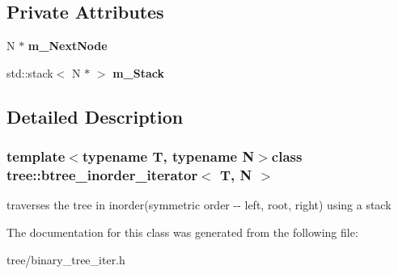 \subsection*{\-Private \-Attributes}
\begin{DoxyCompactItemize}
\item 
\hypertarget{classtree_1_1btree__inorder__iterator_aa2586ca852a9b462b0774af427a7a10f}{\-N $\ast$ {\bfseries m\-\_\-\-Next\-Node}}\label{classtree_1_1btree__inorder__iterator_aa2586ca852a9b462b0774af427a7a10f}

\item 
\hypertarget{classtree_1_1btree__inorder__iterator_a35c2412b7ad6f89a8ca7eeb2eef3f413}{std\-::stack$<$ \-N $\ast$ $>$ {\bfseries m\-\_\-\-Stack}}\label{classtree_1_1btree__inorder__iterator_a35c2412b7ad6f89a8ca7eeb2eef3f413}

\end{DoxyCompactItemize}


\subsection{\-Detailed \-Description}
\subsubsection*{template$<$typename T, typename N$>$class tree\-::btree\-\_\-inorder\-\_\-iterator$<$ T, N $>$}

traverses the tree in inorder(symmetric order -\/-\/ left, root, right) using a stack 

\-The documentation for this class was generated from the following file\-:\begin{DoxyCompactItemize}
\item 
tree/binary\-\_\-tree\-\_\-iter.\-h\end{DoxyCompactItemize}
